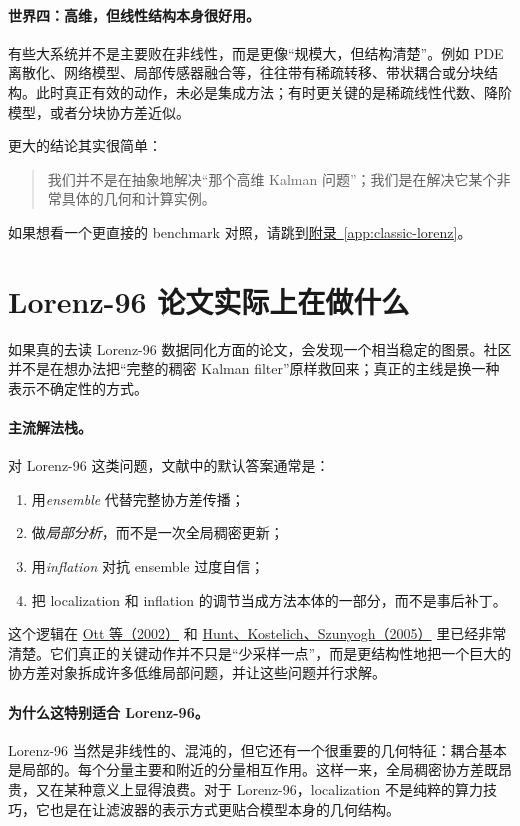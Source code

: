 \documentclass[12pt,a4paper]{ctexart}
\begin{document}
\paragraph{世界四：高维，但线性结构本身很好用。}
有些大系统并不是主要败在非线性，而是更像“规模大，但结构清楚”。例如 PDE 离散化、网络模型、局部传感器融合等，往往带有稀疏转移、带状耦合或分块结构。此时真正有效的动作，未必是集成方法；有时更关键的是稀疏线性代数、降阶模型，或者分块协方差近似。

更大的结论其实很简单：
\begin{quote}
我们并不是在抽象地解决“那个高维 Kalman 问题”；我们是在解决它某个非常具体的几何和计算实例。
\end{quote}

如果想看一个更直接的 benchmark 对照，请跳到\hyperref[app:classic-lorenz]{附录~\ref*{app:classic-lorenz}}。

\section{Lorenz-96 论文实际上在做什么}

如果真的去读 Lorenz-96 数据同化方面的论文，会发现一个相当稳定的图景。社区并不是在想办法把“完整的稠密 Kalman filter”原样救回来；真正的主线是换一种表示不确定性的方式。

\paragraph{主流解法栈。}
对 Lorenz-96 这类问题，文献中的默认答案通常是：
\begin{enumerate}
  \item 用\emph{ensemble} 代替完整协方差传播；
  \item 做\emph{局部分析}，而不是一次全局稠密更新；
  \item 用\emph{inflation} 对抗 ensemble 过度自信；
  \item 把 localization 和 inflation 的调节当成方法本体的一部分，而不是事后补丁。
\end{enumerate}

这个逻辑在 \href{https://arxiv.org/abs/physics/0203058}{Ott 等（2002）} 和 \href{https://arxiv.org/abs/physics/0511236}{Hunt、Kostelich、Szunyogh（2005）} 里已经非常清楚。它们真正的关键动作并不只是“少采样一点”，而是更结构性地把一个巨大的协方差对象拆成许多低维局部问题，并让这些问题并行求解。

\paragraph{为什么这特别适合 Lorenz-96。}
Lorenz-96 当然是非线性的、混沌的，但它还有一个很重要的几何特征：耦合基本是局部的。每个分量主要和附近的分量相互作用。这样一来，全局稠密协方差既昂贵，又在某种意义上显得浪费。对于 Lorenz-96，localization 不是纯粹的算力技巧，它也是在让滤波器的表示方式更贴合模型本身的几何结构。
\end{document}
